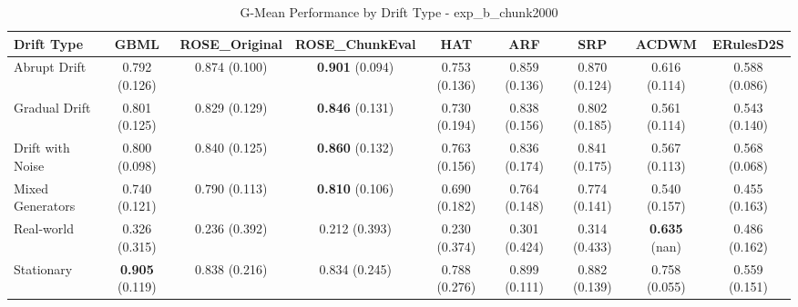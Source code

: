 \begin{table}[htbp]
\centering
\caption{G-Mean Performance by Drift Type - exp_b_chunk2000}
\label{tab:gmean_by_drift_exp_b_chunk2000}
\footnotesize
\begin{tabular}{lcccccccc}
\toprule
Drift Type & GBML & ROSE_Original & ROSE_ChunkEval & HAT & ARF & SRP & ACDWM & ERulesD2S \\
\midrule
Abrupt Drift & 0.792 (0.126) & 0.874 (0.100) & \textbf{0.901} (0.094) & 0.753 (0.136) & 0.859 (0.136) & 0.870 (0.124) & 0.616 (0.114) & 0.588 (0.086) \\
Gradual Drift & 0.801 (0.125) & 0.829 (0.129) & \textbf{0.846} (0.131) & 0.730 (0.194) & 0.838 (0.156) & 0.802 (0.185) & 0.561 (0.114) & 0.543 (0.140) \\
Drift with Noise & 0.800 (0.098) & 0.840 (0.125) & \textbf{0.860} (0.132) & 0.763 (0.156) & 0.836 (0.174) & 0.841 (0.175) & 0.567 (0.113) & 0.568 (0.068) \\
Mixed Generators & 0.740 (0.121) & 0.790 (0.113) & \textbf{0.810} (0.106) & 0.690 (0.182) & 0.764 (0.148) & 0.774 (0.141) & 0.540 (0.157) & 0.455 (0.163) \\
Real-world & 0.326 (0.315) & 0.236 (0.392) & 0.212 (0.393) & 0.230 (0.374) & 0.301 (0.424) & 0.314 (0.433) & \textbf{0.635} (nan) & 0.486 (0.162) \\
Stationary & \textbf{0.905} (0.119) & 0.838 (0.216) & 0.834 (0.245) & 0.788 (0.276) & 0.899 (0.111) & 0.882 (0.139) & 0.758 (0.055) & 0.559 (0.151) \\
\bottomrule
\end{tabular}
\end{table}
